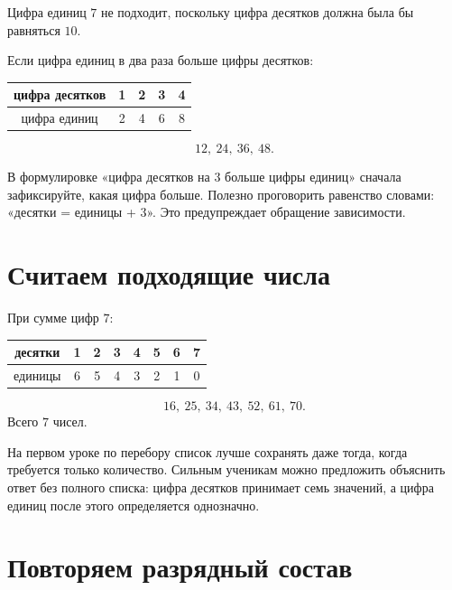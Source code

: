 Цифра единиц \(7\) не подходит, поскольку цифра десятков должна была бы
равняться \(10\).

Если цифра единиц в два раза больше цифры десятков:

\begin{center}
\renewcommand{\arraystretch}{1.35}
\begin{tabular}{c|cccc}
  \toprule
  цифра десятков & 1 & 2 & 3 & 4 \\
  \midrule
  цифра единиц & 2 & 4 & 6 & 8 \\
  \bottomrule
\end{tabular}
\end{center}

\[
  \boxed{12,\ 24,\ 36,\ 48}.
\]

\begin{teacherbox}
  В формулировке «цифра десятков на \(3\) больше цифры единиц» сначала
  зафиксируйте, какая цифра больше. Полезно проговорить равенство словами:
  «десятки = единицы + 3». Это предупреждает обращение зависимости.
\end{teacherbox}

\section{Считаем подходящие числа}

При сумме цифр \(7\):

\begin{center}
\renewcommand{\arraystretch}{1.35}
\begin{tabular}{c|ccccccc}
  \toprule
  десятки & 1 & 2 & 3 & 4 & 5 & 6 & 7 \\
  \midrule
  единицы & 6 & 5 & 4 & 3 & 2 & 1 & 0 \\
  \bottomrule
\end{tabular}
\end{center}

\[
  \boxed{16,\ 25,\ 34,\ 43,\ 52,\ 61,\ 70}.
\]
Всего \(7\) чисел.

\placevaluecountfigure

\begin{teacherbox}
  На первом уроке по перебору список лучше сохранять даже тогда, когда
  требуется только количество. Сильным ученикам можно предложить объяснить
  ответ без полного списка: цифра десятков принимает семь значений, а цифра
  единиц после этого определяется однозначно.
\end{teacherbox}

\section{Повторяем разрядный состав}

